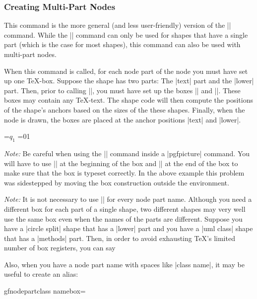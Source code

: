 \subsubsection{Creating Multi-Part Nodes}

\begin{command}{\pgfmultipartnode{}}
    This command is the more general (and less user-friendly) version of the
    |\pgfnode| command. While the |\pgfnode| command can only be used for
    shapes that have a single part (which is the case for most shapes), this
    command can also be used with multi-part nodes.

    When this command is called, for each node part of the node you must have
    set up one \TeX-box. Suppose the shape has two parts: The |text| part and
    the |lower| part. Then, prior to calling |\pgfmultipartnode|, you must have
    set up the boxes |\pgfnodeparttextbox| and |\pgfnodepartlowerbox|. These
    boxes may contain any \TeX-text. The shape code will then compute the
    positions of the shape's anchors based on the sizes of the these shapes.
    Finally, when the node is drawn, the boxes are placed at the anchor
    positions |text| and |lower|.
\begin{codeexample}[preamble={\usetikzlibrary{shapes}}]
\setbox\pgfnodeparttextbox=\hbox{$q_1$}
\setbox\pgfnodepartlowerbox=\hbox{01}
\begin{pgfpicture}
\end{pgfpicture}
\end{codeexample}

    \emph{Note:} Be careful when using the |\setbox| command inside a
    |{pgfpicture}| command. You will have to use |\pgfinterruptpath| at the
    beginning of the box and |\endpgfinterruptpath| at the end of the box to
    make sure that the box is typeset correctly. In the above example this
    problem was sidestepped by moving the box construction outside the
    environment.

    \emph{Note:} It is not necessary to use |\newbox| for every node part
    name. Although you need a different box for each part of a single shape,
    two different shapes may very well use the same box even when the names of
    the parts are different. Suppose you have a |circle split| shape that has a
    |lower| part and you have a |uml class| shape that has a |methods| part.
    Then, in order to avoid exhausting \TeX's limited number of box registers,
    you can say
\begin{codeexample}
\newbox\pgfnodepartlowerbox
\let\pgfnodepartmethodsbox=\pgfnodepartlowerbox
\end{codeexample}
    Also, when you have a node part name with spaces like |class name|, it may
    be useful to create an alias:
\begin{codeexample}
\newbox\mybox
\expandafter\let\csname pgfnodepartclass namebox\endcsname=\mybox
\end{codeexample}
\end{command}

